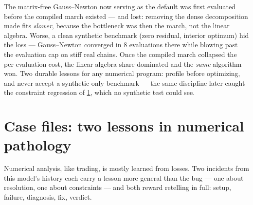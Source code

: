 \documentclass[11pt]{article}
\begin{document}
\begin{caution}[title={The same algorithm, wrong twice, right once}]
The matrix-free Gauss--Newton now serving as the default was first
evaluated before the compiled march existed --- and lost: removing the
dense decomposition made fits \emph{slower}, because the bottleneck was
then the march, not the linear algebra.  Worse, a clean synthetic
benchmark (zero residual, interior optimum) hid the loss --- Gauss--Newton
converged in 8 evaluations there while blowing past the evaluation cap on
stiff real chains.  Once the compiled march collapsed the per-evaluation
cost, the linear-algebra share dominated and the \emph{same} algorithm
won.  Two durable lessons for any numerical program: profile before
optimizing, and never accept a synthetic-only benchmark --- the same
discipline later caught the constraint regression of \cref{sec:cases},
which no synthetic test could see.
\end{caution}

\section{Case files: two lessons in numerical pathology}
\label{sec:cases}

Numerical analysis, like trading, is mostly learned from losses.  Two
incidents from this model's history each carry a lesson more general than
the bug --- one about resolution, one about constraints --- and both
reward retelling in full: setup, failure, diagnosis, fix, verdict.
\end{document}
